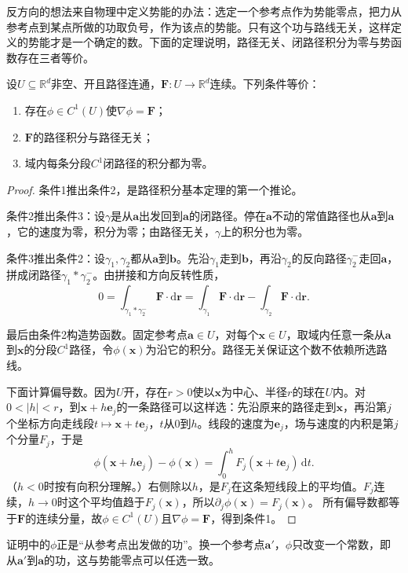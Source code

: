 反方向的想法来自物理中定义势能的办法：选定一个参考点作为势能零点，把力从参考点到某点所做的功取负号，作为该点的势能。只有这个功与路线无关，这样定义的势能才是一个确定的数。下面的定理说明，路径无关、闭路径积分为零与势函数存在三者等价。
\begin{theorem}[路径无关的等价条件]
设$U\subseteq\mathbb R^d$非空、开且路径连通，$\bm F:U\to\mathbb R^d$连续。下列条件等价：
\begin{enumerate}
 \item 存在$\phi\in C^1(U)$使$\nabla\phi=\bm F$；
 \item $\bm F$的路径积分与路径无关；
 \item 域内每条分段$C^1$闭路径的积分都为零。
\end{enumerate}
\end{theorem}
\begin{proof}
条件1推出条件2，是路径积分基本定理的第一个推论。

条件2推出条件3：设$\gamma$是从$\bm a$出发回到$\bm a$的闭路径。停在$\bm a$不动的常值路径也从$\bm a$到$\bm a$，它的速度为零，积分为零；由路径无关，$\gamma$上的积分也为零。

条件3推出条件2：设$\gamma_1,\gamma_2$都从$\bm a$到$\bm b$。先沿$\gamma_1$走到$\bm b$，再沿$\gamma_2$的反向路径$\gamma_2^-$走回$\bm a$，拼成闭路径$\gamma_1*\gamma_2^-$。由拼接和方向反转性质，
\[
 0=\int_{\gamma_1*\gamma_2^-}\bm F\cdot\mathrm d\bm r
 =\int_{\gamma_1}\bm F\cdot\mathrm d\bm r-\int_{\gamma_2}\bm F\cdot\mathrm d\bm r.
\]

最后由条件2构造势函数。固定参考点$\bm a\in U$，对每个$\bm x\in U$，取域内任意一条从$\bm a$到$\bm x$的分段$C^1$路径，令$\phi(\bm x)$为沿它的积分。路径无关保证这个数不依赖所选路线。

下面计算偏导数。因为$U$开，存在$r>0$使以$\bm x$为中心、半径$r$的球在$U$内。对$0<|h|<r$，到$\bm x+h\bm e_j$的一条路径可以这样选：先沿原来的路径走到$\bm x$，再沿第$j$个坐标方向走线段$t\mapsto\bm x+t\bm e_j$，$t$从$0$到$h$。线段的速度为$\bm e_j$，场与速度的内积是第$j$个分量$F_j$，于是
\[
 \phi(\bm x+h\bm e_j)-\phi(\bm x)
 =\int_0^h F_j(\bm x+t\bm e_j)\,\mathrm dt.
\]
（$h<0$时按有向积分理解。）右侧除以$h$，是$F_j$在这条短线段上的平均值。$F_j$连续，$h\to0$时这个平均值趋于$F_j(\bm x)$，所以$\partial_j\phi(\bm x)=F_j(\bm x)$。
所有偏导数都等于$\bm F$的连续分量，故$\phi\in C^1(U)$且$\nabla\phi=\bm F$，得到条件1。
\end{proof}

证明中的$\phi$正是“从参考点出发做的功”。换一个参考点$\bm a'$，$\phi$只改变一个常数，即从$\bm a'$到$\bm a$的功，这与势能零点可以任选一致。

